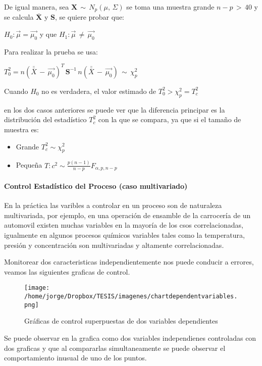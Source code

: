 \documentclass[english]{report}
\begin{document}
De igual manera, sea $\textbf{X}\,\sim\,N_p(\mu,\,\Sigma)$ se toma una muestra grande $n-p\,>\,40$ y se calcula $\bar{ \textbf{X}}$ y $\textbf{S}$, se quiere probar que:

$H_0:\vec{\mu} = \vec{\mu_0}$ y que $H_1: \vec{\mu}\,\neq\,\vec{\mu_0}$  

Para realizar la prueba se usa:

$T_0^2 = n(\bar{\bar{X}}\,-\,\vec{\mu_0})^T\,\textbf{S}^{-1}\,n(\bar{\bar{X}}\,-\,\vec{\mu_0})\,\sim\,\chi_p^2$

Cuando $H_0$ no es verdadera, el valor estimado de $T_0^2 > \chi_p^2 = T_c^2$ 

en los dos casos anteriores se puede ver que la diferencia principar es la distribución del estadístico $T_c^2$ con la que se compara, ya que si el tamaño de muestra es: 

\begin{itemize}
\item Grande $T_c^2 \sim \chi_p^2$
\item Pequeña $T:c^2 \sim \frac{p(n-1)}{n-p}F_{\alpha,p,n-p}$
\end{itemize}

\paragraph{Control Estadístico del Proceso (caso multivariado)}

En la práctica las varibles a controlar en un proceso son de naturaleza multivariada, por ejemplo, en una operación de ensamble de la carrocería de un automovil existen muchas variables en la mayoría de los csos correlacionadas, igualmente en algunos procesos químicos variables tales como la temperatura, presión y concentración son multivariadas y altamente correlacionadas.

Monitorear dos caracteristicas independientemente nos puede conducir a errores, veamos las siguientes graficas de control.

\begin{figure}[H]
\centering
\texttt{[image: /home/jorge/Dropbox/TESIS/imagenes/chartdependentvariables.png]}
\caption{Gráficas de control superpuestas de dos variables dependientes}
\label{c2f7}
\end{figure}

Se puede observar en la grafica \label{c2f7} como dos variables independienes controladas con dos graficas y que al compararlas simultaneamente se puede observar el comportamiento inusual de uno de los puntos.
\end{document}
